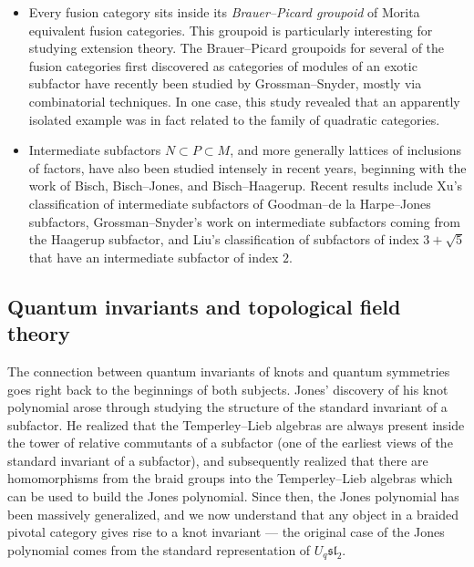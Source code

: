 \documentclass[12pt]{article}
\begin{document}
\begin{itemize}
\item Every fusion category sits inside its \emph{Brauer--Picard groupoid} of Morita equivalent fusion categories. This groupoid is particularly interesting for studying extension theory. The Brauer--Picard groupoids for several of the fusion categories first discovered as categories of modules of an exotic subfactor have recently been studied by Grossman--Snyder, mostly via combinatorial techniques. In one case, this study revealed that an apparently isolated example was in fact related to the family of quadratic categories.
\item Intermediate subfactors $N \subset P \subset M$, and more generally lattices of inclusions of factors, have also been studied intensely in recent years, beginning with the work of Bisch, Bisch--Jones, and Bisch--Haagerup. Recent results include Xu's classification of intermediate subfactors of Goodman--de la Harpe--Jones subfactors, Grossman--Snyder's work on intermediate subfactors coming from the Haagerup subfactor, and Liu's classification of subfactors of index $3+\sqrt{5}$ that have an intermediate subfactor of index $2$.
\end{itemize}


\subsection{Quantum invariants and topological field theory}
The connection between quantum invariants of knots and quantum symmetries goes right back to the beginnings of both subjects. Jones' discovery of his knot polynomial arose through studying the structure of the standard invariant of a subfactor. He realized that the Temperley--Lieb algebras are always present inside the tower of relative commutants of a subfactor (one of the earliest views of the standard invariant of a subfactor), and subsequently realized that there are homomorphisms from the braid groups into the Temperley--Lieb algebras which can be used to build the Jones polynomial. Since then, the Jones polynomial has been massively generalized, and we now understand that any object in a braided pivotal category gives rise to a knot invariant --- the original case of the Jones polynomial comes from the standard representation of $U_q \mathfrak{sl}_2$.

\end{document}
